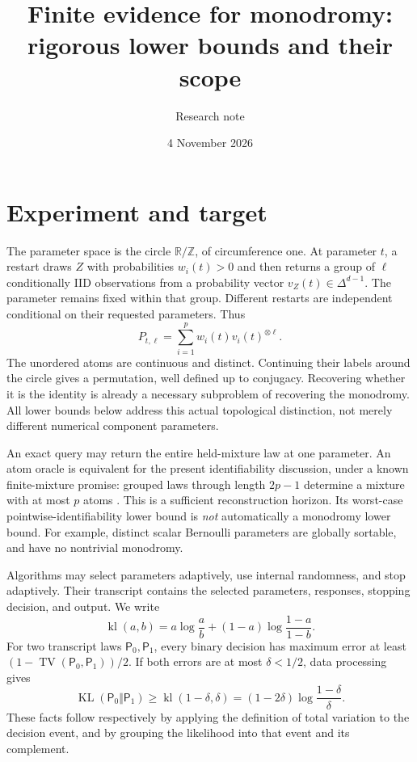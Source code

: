 \documentclass[11pt]{article}
\title{Finite evidence for monodromy: rigorous lower bounds and their scope}
\author{Research note}
\date{4 November 2026}
\theoremstyle{remark}\newtheorem{remark}[theorem]{Remark}
\newcommand{\TV}{\operatorname{TV}}
\newcommand{\KL}{\operatorname{KL}}
\newcommand{\kl}{\operatorname{kl}}
\newcommand{\R}{\mathbb R}
\begin{document}
\maketitle

\section{Experiment and target}
The parameter space is the circle $\R/\mathbb Z$, of circumference one. At parameter $t$, a restart draws $Z$ with probabilities $w_i(t)>0$ and then returns a group of $\ell$ conditionally IID observations from a probability vector $v_Z(t)\in\Delta^{d-1}$. The parameter remains fixed within that group. Different restarts are independent conditional on their requested parameters. Thus
\[
 P_{t,\ell}=\sum_{i=1}^p w_i(t)v_i(t)^{\otimes\ell}.
\]
The unordered atoms are continuous and distinct. Continuing their labels around the circle gives a permutation, well defined up to conjugacy. Recovering whether it is the identity is already a necessary subproblem of recovering the monodromy. All lower bounds below address this actual topological distinction, not merely different numerical component parameters.

An exact query may return the entire held-mixture law at one parameter. An atom oracle is equivalent for the present identifiability discussion, under a known finite-mixture promise: grouped laws through length $2p-1$ determine a mixture with at most $p$ atoms \cite{VS,VSoperator}. This is a sufficient reconstruction horizon. Its worst-case pointwise-identifiability lower bound is \emph{not} automatically a monodromy lower bound. For example, distinct scalar Bernoulli parameters are globally sortable, and have no nontrivial monodromy.

Algorithms may select parameters adaptively, use internal randomness, and stop adaptively. Their transcript contains the selected parameters, responses, stopping decision, and output. We write
\[
 \kl(a,b)=a\log\frac ab+(1-a)\log\frac{1-a}{1-b}.
\]
For two transcript laws $\mathsf P_0,\mathsf P_1$, every binary decision has maximum error at least $(1-\TV(\mathsf P_0,\mathsf P_1))/2$. If both errors are at most $\delta<1/2$, data processing gives
\begin{equation}\label{eq:testing}
 \KL(\mathsf P_0\Vert\mathsf P_1)\geq\kl(1-\delta,\delta)
 =(1-2\delta)\log\frac{1-\delta}{\delta}.
\end{equation}
These facts follow respectively by applying the definition of total variation to the decision event, and by grouping the likelihood into that event and its complement.
\end{document}
